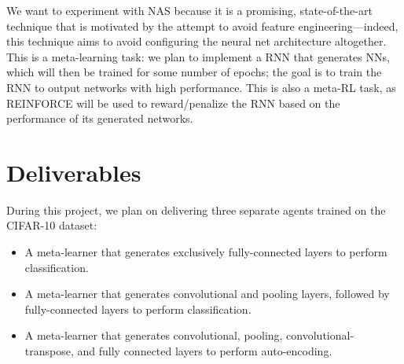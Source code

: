 \documentclass{article}
\begin{document}
We want to experiment with NAS because it is a promising, state-of-the-art technique that is motivated by the attempt to avoid feature engineering—indeed, this technique aims to avoid configuring the neural net architecture altogether.
This is a meta-learning task: we plan to implement a RNN that generates NNs, which will then be trained for some number of epochs; the goal is to train the RNN to output networks with high performance.
This is also a meta-RL task, as REINFORCE will be used to reward/penalize the RNN based on the performance of its generated networks.

\section{Deliverables}
During this project, we plan on delivering three separate agents trained on the CIFAR-10 dataset:
\vspace{-1em}
\begin{itemize}
	\item A meta-learner that generates exclusively fully-connected layers to perform classification. 
	\vspace{-1em}
	\item A meta-learner that generates convolutional and pooling layers, followed by fully-connected layers to perform classification.
	\vspace{-1em}
	\item A meta-learner that generates convolutional, pooling, convolutional-transpose, and fully connected layers to perform auto-encoding.
\end{itemize}
\vspace{-1em}



\end{document}
